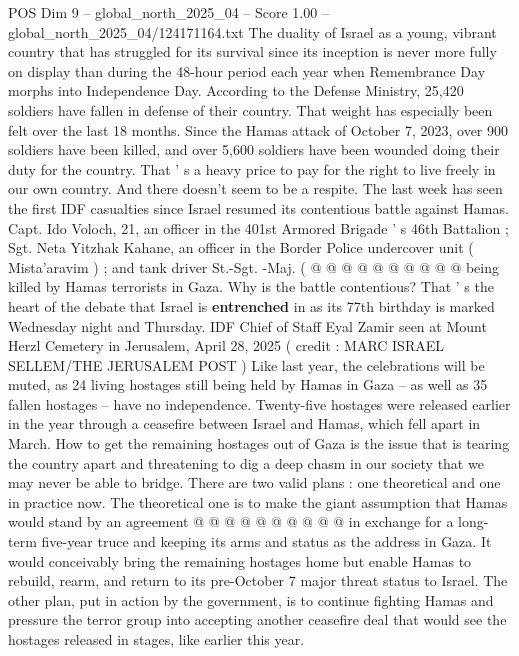 \begin{textsample}{POS Dim 9 – global\_north\_2025\_04 – Score 1.00 – global\_north\_2025\_04/124171164.txt}  \label{ex:f9_pos_318}
The duality of Israel as a young, vibrant country that has struggled for its survival since its inception is never more fully on display than during the 48-hour period each year when Remembrance Day morphs into Independence Day.
According to the Defense Ministry, 25,420 soldiers have fallen in defense of their country.
That weight has especially been felt over the last 18 months.
Since the Hamas attack of October 7, 2023, over 900 soldiers have been killed, and over 5,600 soldiers have been wounded doing their duty for the country.
That ' s a heavy price to pay for the right to live freely in our own country.
And there doesn't seem to be a respite.
The last week has seen the first IDF casualties since Israel resumed its contentious battle against Hamas.
Capt.
Ido Voloch, 21, an officer in the 401st Armored Brigade ' s 46th Battalion ; Sgt.
Neta Yitzhak Kahane, an officer in the Border Police undercover unit ( Mista'aravim ) ; and tank driver St.-Sgt. -Maj. ( @ @ @ @ @ @ @ @ @ @ being killed by Hamas terrorists in Gaza.
Why is the battle contentious?
That ' s the heart of the debate that Israel is \textbf{entrenched} in as its 77th birthday is marked Wednesday night and Thursday.
IDF Chief of Staff Eyal Zamir seen at Mount Herzl Cemetery in Jerusalem, April 28, 2025 ( credit : MARC ISRAEL SELLEM/THE JERUSALEM POST ) Like last year, the celebrations will be muted, as 24 living hostages still being held by Hamas in Gaza -- as well as 35 fallen hostages -- have no independence.
Twenty-five hostages were released earlier in the year through a ceasefire between Israel and Hamas, which fell apart in March.
How to get the remaining hostages out of Gaza is the issue that is tearing the country apart and threatening to dig a deep chasm in our society that we may never be able to bridge.
There are two valid plans : one theoretical and one in practice now.
The theoretical one is to make the giant assumption that Hamas would stand by an agreement @ @ @ @ @ @ @ @ @ @ in exchange for a long-term five-year truce and keeping its arms and status as the address in Gaza.
It would conceivably bring the remaining hostages home but enable Hamas to rebuild, rearm, and return to its pre-October 7 major threat status to Israel.
The other plan, put in action by the government, is to continue fighting Hamas and pressure the terror group into accepting another ceasefire deal that would see the hostages released in stages, like earlier this year.

\end{textsample}

